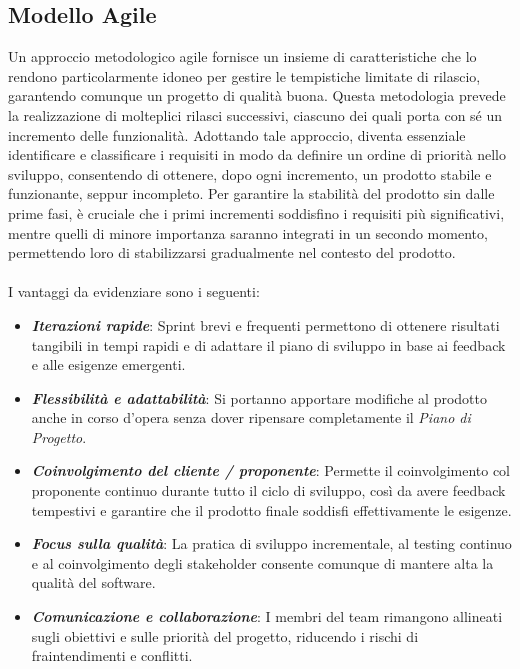 \subsection{Modello Agile}
Un approccio metodologico agile fornisce un insieme di caratteristiche che lo rendono particolarmente idoneo per gestire le tempistiche limitate di rilascio, garantendo comunque un progetto di qualità buona.
Questa metodologia prevede la realizzazione di molteplici rilasci successivi, ciascuno dei quali porta con sé un incremento delle funzionalità. Adottando tale approccio, diventa essenziale identificare e classificare i requisiti in modo da definire un ordine di priorità nello sviluppo, consentendo di ottenere, dopo ogni incremento, un prodotto stabile e funzionante, seppur incompleto. Per garantire la stabilità del prodotto sin dalle prime fasi, è cruciale che i primi incrementi soddisfino i requisiti più significativi, mentre quelli di minore importanza saranno integrati in un secondo momento, permettendo loro di stabilizzarsi gradualmente nel contesto del prodotto.
\\\\
I vantaggi da evidenziare sono i seguenti:
\begin{itemize}
\setlength\itemsep{0em}
\item
\textbf{\emph{Iterazioni rapide}}: Sprint brevi e frequenti permettono di ottenere risultati tangibili in tempi rapidi e di adattare il piano di sviluppo in base ai feedback e alle esigenze emergenti.
\item
\textbf{\emph{Flessibilità e adattabilità}}: Si portanno apportare modifiche al prodotto anche in corso d'opera senza dover ripensare completamente il \textit{Piano di Progetto}.
\item
\textbf{\emph{Coinvolgimento del cliente / proponente}}: Permette il coinvolgimento col proponente continuo durante tutto il ciclo di sviluppo, così da avere feedback tempestivi e garantire che il prodotto finale soddisfi effettivamente le esigenze.
\item
\textbf{\emph{Focus sulla qualità}}: La pratica di sviluppo incrementale, al testing continuo e al coinvolgimento degli stakeholder consente comunque di mantere alta la qualità del software.
\item
\textbf{\emph{Comunicazione e collaborazione}}: I membri del team rimangono allineati sugli obiettivi e sulle priorità del progetto, riducendo i rischi di fraintendimenti e conflitti.
\end{itemize}